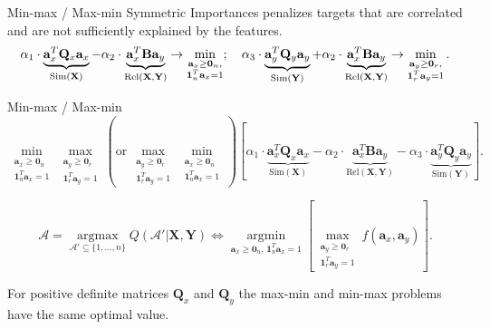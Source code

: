 \documentclass[9pt]{beamer}
\newcommand{\ba}{\mathbf{a}}
\newcommand{\bY}{\mathbf{Y}}
\newcommand{\bX}{\mathbf{X}}
\newcommand{\bB}{\mathbf{B}}
\newcommand{\bQ}{\mathbf{Q}}
\newcommand{\cA}{\mathcal{A}}
\newcommand{\bOne}{\boldsymbol{1}}
\newcommand{\bZero}{\boldsymbol{0}}
\newcommand{\argmin}{\mathop{\arg \min}\limits}
\newcommand{\argmax}{\mathop{\arg \max}\limits}
\begin{document}
\begin{frame}{Min-max / Max-min}
	Symmetric Importances penalizes targets that are correlated and are not sufficiently explained by the features. 
	\[
	\alpha_1 \cdot \underbrace{\ba_x^T \bQ_x \ba_x}_{\text{Sim}(\bX)} - \alpha_2 \cdot \underbrace{\vphantom{()} \ba_x^T\mathbf{B} \ba_y}_{\text{Rel}(\bX, \bY)} \rightarrow \min_{\substack{\ba_x \geq \bZero_n, \\ \bOne_n^T\ba_x=1}}; \quad
	\alpha_3 \cdot \underbrace{\ba_y^T \bQ_y \ba_y}_{\text{Sim}(\bY)} + \alpha_2 \cdot \underbrace{\vphantom{()} \ba_x^T \mathbf{B} \ba_y}_{\text{Rel}(\bX, \bY)} \rightarrow \min_{\substack{\ba_y \geq \bZero_r,  \\ \bOne_r^T\ba_y=1}}.
	\]
	\begin{block}{Min-max / Max-min}
	\vspace{-0.5cm}
	\[
	\min_{\substack{\ba_x \geq \bZero_n \\ \bOne_n^T\ba_x=1}} 	\max_{\substack{\ba_y \geq \bZero_r \\ \bOne_r^T\ba_y=1}} \left(\text {or} \, \max_{\substack{\ba_y \geq \bZero_r \\ \bOne_r^T\ba_y=1}} \min_{\substack{\ba_x \geq \bZero_n \\ \bOne_n^T\ba_x=1}}\right) \left[\alpha_1 \cdot \underbrace{\ba_x^T \bQ_x \ba_x}_{\text{Sim}(\bX)} - \alpha_2 \cdot \underbrace{\ba_x^T \bB \ba_y}_{\text{Rel}(\bX, \bY)} - \alpha_3 \cdot \underbrace{\ba_y^T \bQ_y \ba_y}_{\text{Sim}(\bY)}\right].
	\]
	\end{block}
	\[
	\cA = \argmax_{\cA' \subseteq \{1, \dots, n\}} Q(\cA' | \bX, \bY) \Leftrightarrow \argmin_{\ba_x \geq \bZero_n, \, \bOne_n^T\ba_x=1} \left[\max_{\substack{\ba_y \geq \bZero_r \\ \bOne_r^T\ba_y=1}} f(\ba_x, \ba_y)\right].
	\]
	\begin{theorem}
		For positive definite matrices $\bQ_x$ and $\bQ_y$ the max-min and min-max problems have the same optimal value. 
	\end{theorem}

\end{frame}
\end{document}
